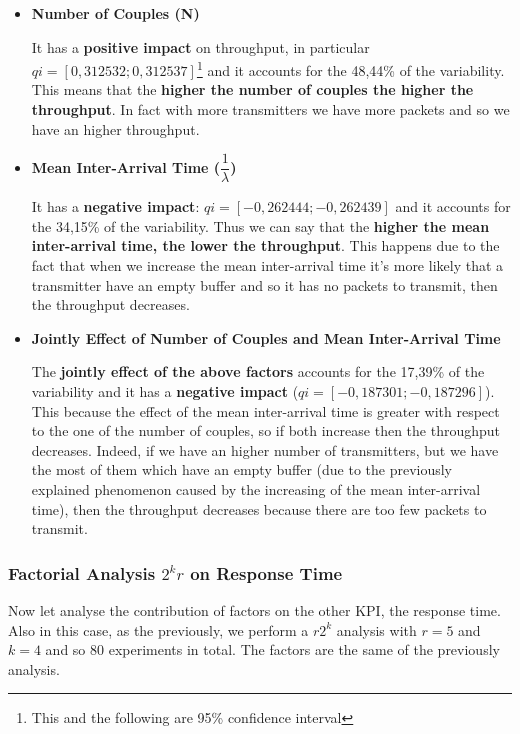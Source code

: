 \begin{itemize}
	\item \textbf{Number of Couples (N)}
	
	\noindent It has a \textbf{positive impact} on throughput, in particular $qi = [0,312532; 0,312537]$\footnote{This and the following are 95\% confidence interval} and it accounts for the 48,44\% of the variability. This means that the \textbf{higher the number of couples the higher the throughput}. In fact with more transmitters we have more packets and so we have an higher throughput.
	 
	\item \textbf{Mean Inter-Arrival Time ($\dfrac{1}{\lambda}$)}
	
	\noindent It has a \textbf{negative impact}: $qi = [-0,262444; -0,262439]$ and it accounts for the 34,15\% of the variability. Thus we can say that the \textbf{higher the mean inter-arrival time, the lower the throughput}. This happens due to the fact that when we increase the mean inter-arrival time it's more likely that a transmitter have an empty buffer and so it has no packets to transmit, then the throughput decreases. 
	
	\item \textbf{Jointly Effect of Number of Couples and Mean Inter-Arrival Time}
	
	\noindent The \textbf{jointly effect of the above factors} accounts for the 17,39\% of the variability and it has a \textbf{negative impact} ($qi = [-0,187301; -0,187296]$). This because the effect of the mean inter-arrival time is greater with respect to the one of the number of couples, so if both increase then the throughput decreases. Indeed, if we have an higher number of transmitters, but we have the most of them which have an empty buffer (due to the previously explained phenomenon caused by the increasing of the mean inter-arrival time), then the throughput decreases because there are too few packets to transmit.
\end{itemize}

\subsubsection{Factorial Analysis $2^kr$ on Response Time}
Now let analyse the contribution of factors on the other KPI, the response time. Also in this case, as the previously, we perform a $r2^k$ analysis with $r=5$ and $k=4$ and so 80 experiments in total. The factors are the same of the previously analysis.

